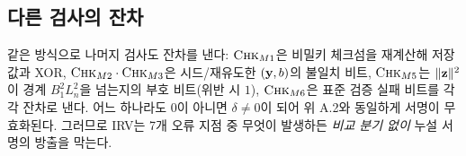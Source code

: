 \subsection{다른 검사의 잔차}
같은 방식으로 나머지 검사도 잔차를 낸다: $\textsc{Chk}_{M1}$은 비밀키 체크섬을 재계산해 저장값과 XOR,
$\textsc{Chk}_{M2}\cdot\textsc{Chk}_{M3}$은 시드/재유도한 $(\mathbf{y},b)$의 불일치 비트,
$\textsc{Chk}_{M5}$는 $\lVert\mathbf{z}\rVert^2$이 경계 $B_1^2 L_n^2$을 넘는지의 부호 비트(위반 시 $1$),
$\textsc{Chk}_{M6}$은 표준 검증 실패 비트를 각각 잔차로 낸다. 어느 하나라도 $0$이 아니면 $\delta\neq0$이
되어 위 A.2와 동일하게 서명이 무효화된다. 그러므로 IRV는 7개 오류 지점 중 무엇이 발생하든 \emph{비교
분기 없이} 누설 서명의 방출을 막는다.
